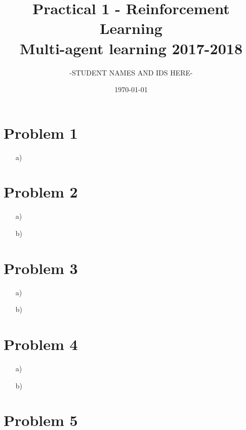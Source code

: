 \documentclass[12pt]{article}
\title{Practical 1 - Reinforcement Learning \\
	\large Multi-agent learning 2017-2018}
\author{-STUDENT NAMES AND IDS HERE-}
\date{\today}
\begin{document}
\maketitle

\section*{Problem 1}

\begin{enumerate}
	\item[a)]

\end{enumerate}

\section*{Problem 2}
\begin{enumerate}
	\item[a)]
	\item[b)]
\end{enumerate}

\section*{Problem 3}

\begin{enumerate}
	\item[a)]
	\item[b)]
\end{enumerate}

\section*{Problem 4}

\begin{enumerate}
	\item[a)]
	\item[b)]
\end{enumerate}

\section*{Problem 5}
\end{document}
